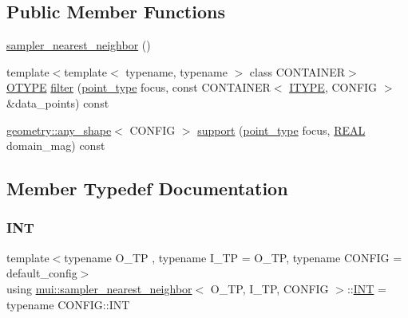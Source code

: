 \subsection*{Public Member Functions}
\begin{DoxyCompactItemize}
\item 
\hyperlink{classmui_1_1sampler__nearest__neighbor_adfecb46e4cb07c349505b563b061540b}{sampler\+\_\+nearest\+\_\+neighbor} ()
\item 
{\footnotesize template$<$template$<$ typename, typename $>$ class C\+O\+N\+T\+A\+I\+N\+ER$>$ }\\\hyperlink{classmui_1_1sampler__nearest__neighbor_a20f17bd1227ef27fd3e7658b773547ff}{O\+T\+Y\+PE} \hyperlink{classmui_1_1sampler__nearest__neighbor_aab0a19a5437eecb12d6d3baa7813e2aa}{filter} (\hyperlink{classmui_1_1sampler__nearest__neighbor_ace9bf5dd74eb5ff63c05941c5cf2a825}{point\+\_\+type} focus, const C\+O\+N\+T\+A\+I\+N\+ER$<$ \hyperlink{classmui_1_1sampler__nearest__neighbor_aa36c4aae91219490c854650da1b1e674}{I\+T\+Y\+PE}, C\+O\+N\+F\+IG $>$ \&data\+\_\+points) const
\item 
\hyperlink{classmui_1_1geometry_1_1any__shape}{geometry\+::any\+\_\+shape}$<$ C\+O\+N\+F\+IG $>$ \hyperlink{classmui_1_1sampler__nearest__neighbor_a6644a7e88f3f66b8ca6fd772cd0d4090}{support} (\hyperlink{classmui_1_1sampler__nearest__neighbor_ace9bf5dd74eb5ff63c05941c5cf2a825}{point\+\_\+type} focus, \hyperlink{classmui_1_1sampler__nearest__neighbor_ab3c299b171cbfaba19246f02644c062a}{R\+E\+AL} domain\+\_\+mag) const
\end{DoxyCompactItemize}


\subsection{Member Typedef Documentation}
\mbox{\label{classmui_1_1sampler__nearest__neighbor_a487918730d940968d94716a0f8badd85}} 
\subsubsection{\texorpdfstring{I\+NT}{INT}}
{\footnotesize\ttfamily template$<$typename O\+\_\+\+TP , typename I\+\_\+\+TP  = O\+\_\+\+TP, typename C\+O\+N\+F\+IG  = default\+\_\+config$>$ \\
using \hyperlink{classmui_1_1sampler__nearest__neighbor}{mui\+::sampler\+\_\+nearest\+\_\+neighbor}$<$ O\+\_\+\+TP, I\+\_\+\+TP, C\+O\+N\+F\+IG $>$\+::\hyperlink{classmui_1_1sampler__nearest__neighbor_a487918730d940968d94716a0f8badd85}{I\+NT} =  typename C\+O\+N\+F\+I\+G\+::\+I\+NT}

